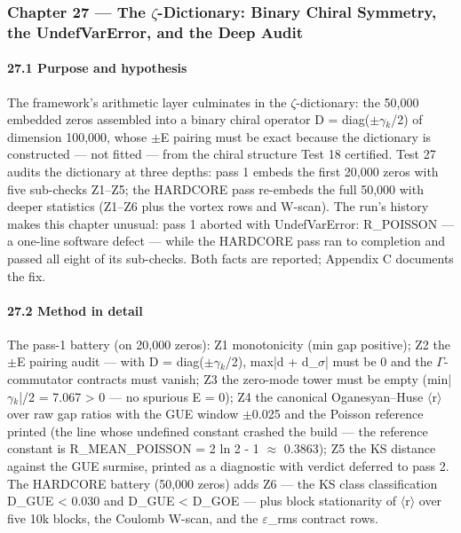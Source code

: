 \documentclass[10pt]{article}
\begin{document}
\subsubsection{Chapter 27 --- The $\zeta$-Dictionary: Binary Chiral Symmetry, the UndefVarError, and the Deep Audit}

\paragraph{27.1 Purpose and hypothesis}

The framework's arithmetic layer culminates in the $\zeta$-dictionary: the 50,000 embedded zeros assembled into a binary chiral operator D = diag($\pm$$\gamma$$_k$/2) of dimension 100,000, whose $\pm$E pairing must be exact because the dictionary is constructed --- not fitted --- from the chiral structure Test 18 certified. Test 27 audits the dictionary at three depths: pass 1 embeds the first 20,000 zeros with five sub-checks Z1--Z5; the HARDCORE pass re-embeds the full 50,000 with deeper statistics (Z1--Z6 plus the vortex rows and W-scan). The run's history makes this chapter unusual: pass 1 aborted with UndefVarError: R\_POISSON --- a one-line software defect --- while the HARDCORE pass ran to completion and passed all eight of its sub-checks. Both facts are reported; Appendix C documents the fix.

\paragraph{27.2 Method in detail}

The pass-1 battery (on 20,000 zeros): Z1 monotonicity (min gap positive); Z2 the $\pm$E pairing audit --- with D = diag($\pm$$\gamma$$_k$/2), max|d + d\_$\sigma$| must be 0 and the $\Gamma$-commutator contracts must vanish; Z3 the zero-mode tower must be empty (min|$\gamma$$_k$|/2 = 7.067 > 0 --- no spurious E = 0); Z4 the canonical Oganesyan--Huse $\langle$r$\rangle$ over raw gap ratios with the GUE window $\pm$0.025 and the Poisson reference printed (the line whose undefined constant crashed the build --- the reference constant is R\_MEAN\_POISSON = 2 ln 2 - 1 $\approx$ 0.3863); Z5 the KS distance against the GUE surmise, printed as a diagnostic with verdict deferred to pass 2. The HARDCORE battery (50,000 zeros) adds Z6 --- the KS class classification D\_GUE < 0.030 and D\_GUE < D\_GOE --- plus block stationarity of $\langle$r$\rangle$ over five 10k blocks, the Coulomb W-scan, and the $\varepsilon$\_rms contract rows.
\end{document}
